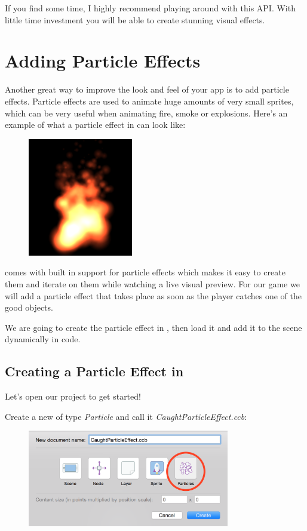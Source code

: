 If you find some time, I highly recommend playing around with this API. With
little time investment you will be able to create stunning visual effects.

\section{Adding Particle Effects}
Another great way to improve the look and feel of your app is to add particle
effects. Particle effects are used to animate huge amounts of very small
sprites, which can be very useful when animating fire, smoke or explosions.
Here's an example of what a particle effect in \cocos{} can look like:

\begin{figure}[H]
  \centering
  \includegraphics[width=130pt]{images/Chapter9/particle_fire.png}
\end{figure}

\SB{} comes with built in support for particle effects which makes it easy to
create them and iterate on them while watching a live visual preview. 
For our game we will add a particle effect that takes place as soon as the
player catches one of the good objects.

We are going to create the particle effect in \SB{}, then load it and add it to
the scene dynamically in code.

\subsection{Creating a Particle Effect in \SB{}}
Let's open our \SB{} project to get started!

\begin{leftbar}
Create a new \ccbfile{} of type \textit{Particle} and call it
\textit{CaughtParticleEffect.ccb}:
\begin{figure}[H]
  \centering
  \includegraphics[width=250pt]{images/Chapter9/create_particle_effect.png}
\end{figure}
\end{leftbar}

